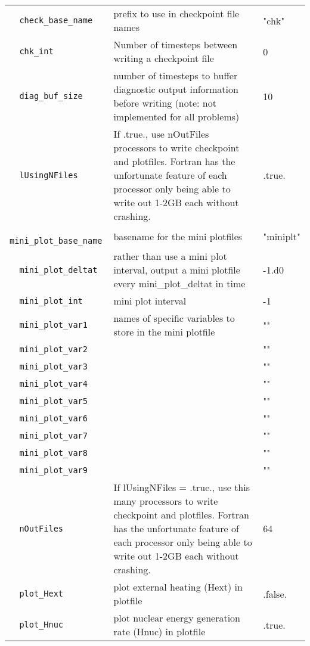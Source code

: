 \begin{landscape}
{\begin{center}
\begin{longtable}{|l|p{5.25in}|l|}
\rowcolor{tableShade}
\verb=  check_base_name  = &   prefix to use in checkpoint file names  &  "chk" \\
\verb=  chk_int  = &   Number of timesteps between writing a checkpoint file  &  0 \\
\rowcolor{tableShade}
\verb=  diag_buf_size  = &   number of timesteps to buffer diagnostic output information before writing (note: not implemented for all problems)  &  10 \\
\verb=  lUsingNFiles  = &   If .true., use nOutFiles processors to write checkpoint and plotfiles. Fortran has the unfortunate feature of each processor only being able to write out 1-2GB each without crashing.  &  .true. \\
\rowcolor{tableShade}
\verb=  mini_plot_base_name  = &   basename for the mini plotfiles  &  "miniplt" \\
\verb=  mini_plot_deltat  = &   rather than use a mini plot interval, output a mini plotfile every mini\_plot\_deltat in time  &  -1.d0 \\
\rowcolor{tableShade}
\verb=  mini_plot_int  = &   mini plot interval  &  -1 \\
\verb=  mini_plot_var1  = &   names of specific variables to store in the mini plotfile  &  "" \\
\rowcolor{tableShade}
\verb=  mini_plot_var2  = &    &  "" \\
\verb=  mini_plot_var3  = &    &  "" \\
\rowcolor{tableShade}
\verb=  mini_plot_var4  = &    &  "" \\
\verb=  mini_plot_var5  = &    &  "" \\
\rowcolor{tableShade}
\verb=  mini_plot_var6  = &    &  "" \\
\verb=  mini_plot_var7  = &    &  "" \\
\rowcolor{tableShade}
\verb=  mini_plot_var8  = &    &  "" \\
\verb=  mini_plot_var9  = &    &  "" \\
\rowcolor{tableShade}
\verb=  nOutFiles  = &   If lUsingNFiles = .true., use this many processors to write checkpoint and plotfiles.  Fortran has the unfortunate feature of each processor only being able to write out 1-2GB each without crashing.  &  64 \\
\verb=  plot_Hext  = &   plot external heating (Hext) in plotfile  &  .false. \\
\rowcolor{tableShade}
\verb=  plot_Hnuc  = &   plot nuclear energy generation rate (Hnuc) in plotfile  &  .true. \\

\end{longtable}
\end{center}}
\end{landscape}
